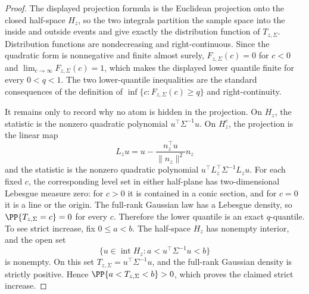 \begin{proof}
The displayed projection formula is the Euclidean projection onto the closed
half-space \(H_z\), so the two integrals partition the sample space into the
inside and outside events and give exactly the distribution function of
\(T_{z,\Sigma}\).  Distribution functions are nondecreasing and
right-continuous.  Since the quadratic form is nonnegative and finite almost
surely, \(F_{z,\Sigma}(c)=0\) for \(c<0\) and
\(\lim_{c\to\infty}F_{z,\Sigma}(c)=1\), which makes the displayed lower
quantile finite for every \(0<q<1\).  The two lower-quantile inequalities are
the standard consequences of the definition of
\(\inf\{c:F_{z,\Sigma}(c)\ge q\}\) and right-continuity.

It remains only to record why no atom is hidden in the projection.  On \(H_z\),
the statistic is the nonzero quadratic polynomial \(u^\top\Sigma^{-1}u\).  On
\(H_z^c\), the projection is the linear map
\[
L_z u=u-\frac{n_z^\top u}{\|n_z\|^2}n_z
\]
and the statistic is the nonzero quadratic polynomial
\(u^\top L_z^\top\Sigma^{-1}L_z u\).  For each fixed \(c\), the corresponding
level set in either half-plane has two-dimensional Lebesgue measure zero:
for \(c>0\) it is contained in a conic section, and for \(c=0\) it is a line
or the origin.  The full-rank Gaussian law has a Lebesgue density, so
\(\PP\{T_{z,\Sigma}=c\}=0\) for every \(c\).  Therefore the lower quantile is
an exact \(q\)-quantile.  To see strict increase, fix \(0\le a<b\).  The
half-space \(H_z\) has nonempty interior, and the open set
\[
\{u\in\operatorname{int}H_z:a<u^\top\Sigma^{-1}u<b\}
\]
is nonempty.  On this set \(T_{z,\Sigma}=u^\top\Sigma^{-1}u\), and the
full-rank Gaussian density is strictly positive.  Hence
\(\PP\{a<T_{z,\Sigma}<b\}>0\), which proves the claimed strict increase.
\end{proof}

